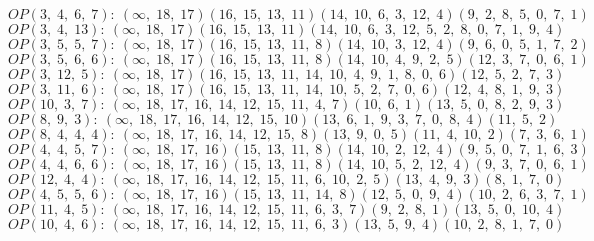 $OP(3, \;4, \;6, \;7): \:(\infty, \;18, \;17)(16, \;15, \;13, \;11)(14, \;10, \;6, \;3, \;12, \;4)(9, \;2, \;8, \;5, \;0, \;7, \;1)$\\
$OP(3, \;4, \;13): \:(\infty, \;18, \;17)(16, \;15, \;13, \;11)(14, \;10, \;6, \;3, \;12, \;5, \;2, \;8, \;0, \;7, \;1, \;9, \;4)$\\
$OP(3, \;5, \;5, \;7): \:(\infty, \;18, \;17)(16, \;15, \;13, \;11, \;8)(14, \;10, \;3, \;12, \;4)(9, \;6, \;0, \;5, \;1, \;7, \;2)$\\
$OP(3, \;5, \;6, \;6): \:(\infty, \;18, \;17)(16, \;15, \;13, \;11, \;8)(14, \;10, \;4, \;9, \;2, \;5)(12, \;3, \;7, \;0, \;6, \;1)$\\
$OP(3, \;12, \;5): \:(\infty, \;18, \;17)(16, \;15, \;13, \;11, \;14, \;10, \;4, \;9, \;1, \;8, \;0, \;6)(12, \;5, \;2, \;7, \;3)$\\
$OP(3, \;11, \;6): \:(\infty, \;18, \;17)(16, \;15, \;13, \;11, \;14, \;10, \;5, \;2, \;7, \;0, \;6)(12, \;4, \;8, \;1, \;9, \;3)$\\
$OP(10, \;3, \;7): \:(\infty, \;18, \;17, \;16, \;14, \;12, \;15, \;11, \;4, \;7)(10, \;6, \;1)(13, \;5, \;0, \;8, \;2, \;9, \;3)$\\
$OP(8, \;9, \;3): \:(\infty, \;18, \;17, \;16, \;14, \;12, \;15, \;10)(13, \;6, \;1, \;9, \;3, \;7, \;0, \;8, \;4)(11, \;5, \;2)$\\
$OP(8, \;4, \;4, \;4): \:(\infty, \;18, \;17, \;16, \;14, \;12, \;15, \;8)(13, \;9, \;0, \;5)(11, \;4, \;10, \;2)(7, \;3, \;6, \;1)$\\
$OP(4, \;4, \;5, \;7): \:(\infty, \;18, \;17, \;16)(15, \;13, \;11, \;8)(14, \;10, \;2, \;12, \;4)(9, \;5, \;0, \;7, \;1, \;6, \;3)$\\
$OP(4, \;4, \;6, \;6): \:(\infty, \;18, \;17, \;16)(15, \;13, \;11, \;8)(14, \;10, \;5, \;2, \;12, \;4)(9, \;3, \;7, \;0, \;6, \;1)$\\
$OP(12, \;4, \;4): \:(\infty, \;18, \;17, \;16, \;14, \;12, \;15, \;11, \;6, \;10, \;2, \;5)(13, \;4, \;9, \;3)(8, \;1, \;7, \;0)$\\
$OP(4, \;5, \;5, \;6): \:(\infty, \;18, \;17, \;16)(15, \;13, \;11, \;14, \;8)(12, \;5, \;0, \;9, \;4)(10, \;2, \;6, \;3, \;7, \;1)$\\
$OP(11, \;4, \;5): \:(\infty, \;18, \;17, \;16, \;14, \;12, \;15, \;11, \;6, \;3, \;7)(9, \;2, \;8, \;1)(13, \;5, \;0, \;10, \;4)$\\
$OP(10, \;4, \;6): \:(\infty, \;18, \;17, \;16, \;14, \;12, \;15, \;11, \;6, \;3)(13, \;5, \;9, \;4)(10, \;2, \;8, \;1, \;7, \;0)$\\
